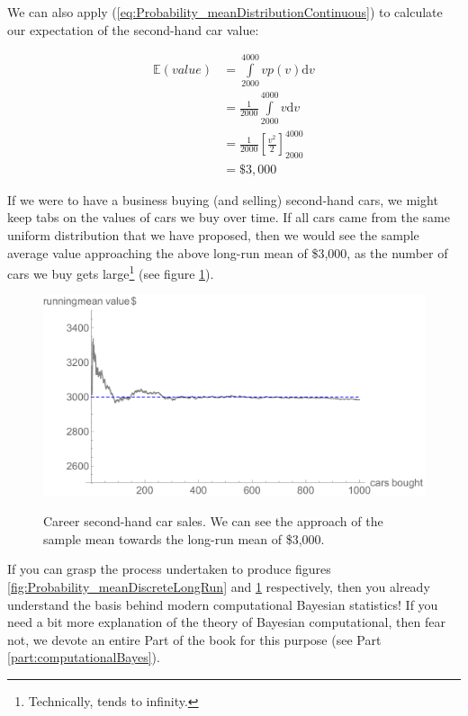 \documentclass[11pt,fullpage]{book}
\begin{document}
We can also apply (\ref{eq:Probability_meanDistributionContinuous}) to calculate our expectation of the second-hand car value:

\begin{equation}\label{eq:Probability_meanCoinContinuous}
\begin{align}
\mathbb{E}(value) &= \int\limits_{2000}^{4000} v p(v)\mathrm{d}v\\
&=\frac{1}{2000} \int\limits_{2000}^{4000} v \mathrm{d}v\\
&= \frac{1}{2000}\left[\frac{v^2}{2}\right]^{4000}_{2000}\\ 
&= \$3,000
\end{align}
\end{equation}

If we were to have a business buying (and selling) second-hand cars, we might keep tabs on the values of cars we buy over time. If all cars came from the same uniform distribution that we have proposed, then we would see the sample average value approaching the above long-run mean of \$3,000, as the number of cars we buy gets large\footnote{Technically, tends to infinity.} (see figure \ref{fig:Probability_meanContinuousLongRun}).

\begin{figure}
\centering
\scalebox{0.55} 
{\includegraphics{Probability_meanContinuousLongRun.pdf}}
\caption{Career second-hand car sales. We can see the approach of the sample mean towards the long-run mean of \$3,000.}\label{fig:Probability_meanContinuousLongRun}
\end{figure}

If you can grasp the process undertaken to produce figures \ref{fig:Probability_meanDiscreteLongRun} and \ref{fig:Probability_meanContinuousLongRun} respectively, then you already understand the basis behind modern computational Bayesian statistics! If you need a bit more explanation of the theory of Bayesian computational, then fear not, we devote an entire Part of the book for this purpose (see Part \ref{part:computationalBayes}).  
\end{document}
